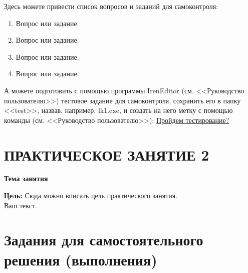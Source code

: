 Здесь можете привести список вопросов и заданий для самоконтроля:
\begin{enumerate}%
\item Вопрос или задание.
\item Вопрос или задание.
\item Вопрос или задание.
\item Вопрос или задание.
\end{enumerate}%

А можете подготовить с помощью программы IrenEditor (см. <<Руководство пользователю>>)
тестовое задание для самоконтроля, сохранить его в папку
<<test>>, назвав, например, lk1.exe, и создать на него метку с помощью
команды (см. <<Руководство пользователю>>): \href{run:test/lk1.exe}{Пройдем тестирование?}

\newpage%
\section*{ПРАКТИЧЕСКОЕ ЗАНЯТИЕ 2}%
 \vspace{-10pt}%
\begin{center}%
 {\bf%
 Тема занятия}
\end{center}%

{\bf Цель:} Сюда можно вписать цель практического занятия.
\\%

Ваш текст.

\newpage%
\section*{Задания для самостоятельного решения (выполнения)}%

